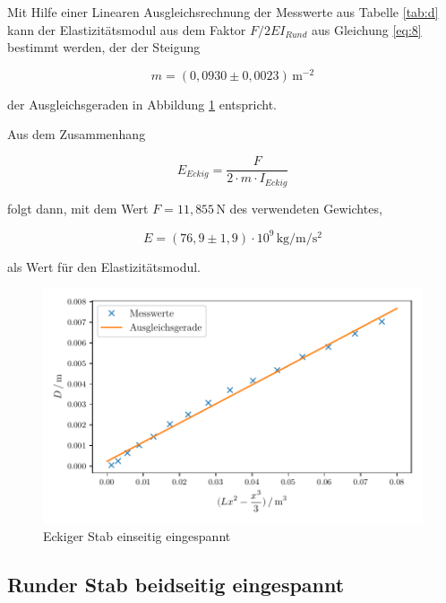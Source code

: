 Mit Hilfe einer Linearen Ausgleichsrechnung der Messwerte
aus Tabelle \ref{tab:d} kann der Elastizitätsmodul aus dem 
Faktor $F/2EI_{Rund}$ aus Gleichung \ref{eq:8} bestimmt werden, der der Steigung 

\begin{equation*}
  m=(0,0930 \pm 0,0023)\,\si{\meter\tothe{-2}}
\end{equation*}

\noindent der Ausgleichsgeraden
in Abbildung \ref{fig:b} entspricht.

Aus dem Zusammenhang 

\begin{equation}
  E_{Eckig}=\frac{F}{2 \cdot m \cdot I_{Eckig}}
\end{equation}

\noindent folgt dann, mit dem Wert $F=11,855\,\si{\newton}$ des verwendeten Gewichtes,

\begin{equation*}
  E=(76,9 \pm 1,9) \cdot 10^9 \,\si{\kilo\gram\per\meter\per\second\squared}
\end{equation*}

\noindent als Wert für den Elastizitätsmodul.



\begin{figure}[H]
  \centering
  \includegraphics{build/plot2.pdf}
  \caption{Eckiger Stab einseitig eingespannt}
  \label{fig:b}
\end{figure}






\subsection{Runder Stab beidseitig eingespannt}


